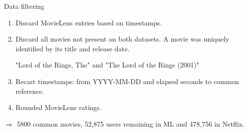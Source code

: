 \begin{frame}{Data filtering}
	\begin{enumerate}
		\item Discard MovieLens entries based on timestamps.
		\item Discard all movies not present on both datasets. A movie was uniquely identified by its title and release date.
		
		\faWarning "Lord of the Rings, The" and "The Lord of the Rings (2001)"
		
		\item Recast timestamps: from YYYY-MM-DD and elapsed seconds to common reference.
		\item Rounded MovieLens ratings.
	\end{enumerate}

	\vspace{0.5cm}
	\begin{centering}
	\hspace{.25\linewidth}\begin{minipage}{.5\linewidth}
		
		$\Longrightarrow$ 5800 common movies, 52,875 users remaining in ML and 478,756 in Netflix.
		
	
	\end{minipage}
\end{centering}
	
\end{frame}


